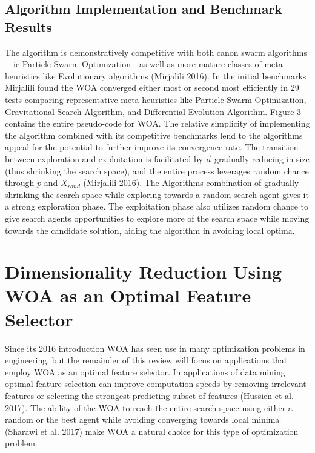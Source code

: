 \documentclass[11pt]{article}
\begin{document}
{\subsection*{Algorithm Implementation and Benchmark Results} {
    The algorithm is demonstratively competitive with both canon swarm algorithms---ie Particle Swarm Optimization---as well as more mature classes of meta-heuristics like Evolutionary algorithms (Mirjalili 2016).
    In the initial benchmarks Mirjalili found the WOA converged either most or second most efficiently in 29 tests comparing representative meta-heuristics like Particle Swarm Optimization, Gravitational Search Algorithm, and Differential Evolution Algorithm.
    Figure 3 contains the entire pseudo-code for WOA.
    The relative simplicity of implementing the algorithm combined with its competitive benchmarks lend to the algorithms appeal for the potential to further improve its convergence rate.
    The transition between exploration and exploitation is facilitated by $\vec{a}$ gradually reducing in size (thus shrinking the search space), and the entire process leverages random chance through $p$ and $X_{rand}$ (Mirjalili 2016).
    The Algorithms combination of gradually shrinking the search space while exploring towards a random search agent gives it a strong exploration phase.
    The exploitation phase also utilizes random chance to give search agents opportunities to explore more of the search space while moving towards the candidate solution, aiding the algorithm in avoiding local optima.
}

\section*{Dimensionality Reduction Using WOA as an Optimal Feature Selector} {
    Since its 2016 introduction WOA has seen use in many optimization problems in engineering, but the remainder of this review will focus on applications that employ WOA as an optimal feature selector.
    In applications of data mining optimal feature selection can improve computation speeds by removing irrelevant features or selecting the strongest predicting subset of features (Hussien et al. 2017).
    The ability of the WOA to reach the entire search space using either a random or the best agent while avoiding converging towards local minima (Sharawi et al. 2017) make WOA a natural choice for this type of optimization problem.

}}
\end{document}

